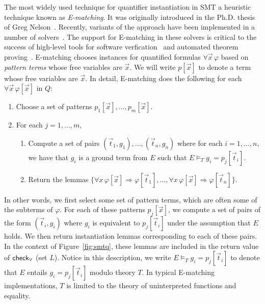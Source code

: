 \documentclass[oribibl]{llncs}
\begin{document}
The most widely used technique for quantifier instantiation in SMT a heuristic technique known as \emph{E-matching}.
It was originally introduced in the Ph.D. thesis of Greg Nelson~\cite{Nelson:1980:TPV:909447}.
Recently, variants of the approach have been implemented in a number of solvers~\cite{Detlefs03simplify:a,DBLP:conf/cav/BarrettT07,Z3,DBLP:conf/cade/BoutonODF09,CVC4-CAV-11,DBLP:conf/lpar/Rummer12}.
The support for E-matching in these solvers is critical to the success of high-level tools for 
software verfication~\cite{DBLP:conf/icse/Leino04,DBLP:conf/itp/ChapmanS14} and automated theorem proving~\cite{blanchette2013extending,bobot2011why3}.
E-matching chooses instances for quantified formulas $\forall \vec x\, \varphi$
based on \emph{pattern terms} whose free variables are $\vec x$.
We will write $p[ \vec x ]$ to denote a term whose free variables are $\vec x$.
In detail, 
E-matching does the following for each $\forall \vec x\, \varphi[ \vec x ]$ in $Q$:
\begin{enumerate}
\item Choose a set of patterns $p_1[ \vec x ], \ldots, p_m[ \vec x ]$.
\item For each $j = 1, \ldots, m$,
\begin{enumerate}
\item Compute a set of pairs $(\vec t_{1},g_{1}), \ldots, (\vec t_{n}, g_{n})$ 
where for each $i = 1, \ldots, n$, we have that $g_i$ is a ground term from $E$ such that $E \models_T g_{i} = p_j[ \vec t_{i} ]$.
\item Return the lemmas $\{ \forall x\, \varphi[\vec x] \Rightarrow \varphi[\vec t_{1}], \ldots, \forall x\, \varphi[\vec x] \Rightarrow \varphi[\vec t_{n}] \}$.
\end{enumerate}
\end{enumerate}

In other words, we first select some set of pattern terms, which are often some of the subterms of $\varphi$.
For each of these patterns $p_j[ \vec x ]$, we compute a set of pairs of the form $( \vec t_i, g_i )$ where 
$g_i$ is equivalent to $p_j[ \vec t_i ]$ under the assumption that $E$ holds.
We then return instantiation lemmas corresponding to each of these pairs. 
In the context of Figure~\ref{fig:smtq}, these lemmas are included in the return value of $\small\mathsf{check}_\forall$ (set $L$).
Notice in this description, we write $E \models_T g_{i} = p_j[ \vec t_{i} ]$ to denote that $E$ entails
$g_{i} = p_j[ \vec t_{i} ]$ modulo theory $T$.  In typical E-matching implementations, $T$ is limited to the theory of uninterpreted functions and equality.
\end{document}
